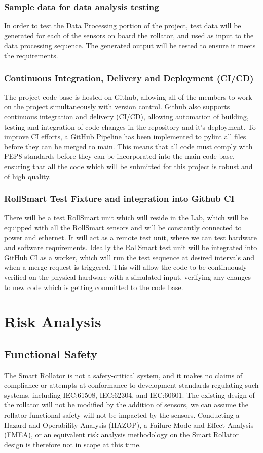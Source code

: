 \documentclass{article}
\begin{document}
\subsubsection{Sample data for data analysis testing}
In order to test the Data Processing portion of the project, test data will be generated for each of the sensors on board the rollator, and used as input to the data processing sequence. The generated output will be tested to ensure it meets the requirements. 

\subsubsection{Continuous Integration, Delivery and Deployment (CI/CD)}
The project code base is hosted on Github, allowing all of the members to work on the project simultaneously with version control. Github also supports continuous integration and delivery (CI/CD), allowing automation of building, testing and integration of code changes in the repository and it's deployment. 
To improve CI efforts, a GitHub Pipeline has been implemented to pylint all files before they can be merged to main. This means that all code must comply with PEP8 standards before they can be incorporated into the main code base, ensuring that all the code which will be submitted for this project is robust and of high quality.

\subsubsection{RollSmart Test Fixture and integration into Github CI}
There will be a test RollSmart unit which will reside in the Lab, which will be equipped with all the RollSmart sensors and will be constantly connected to power and ethernet. It will  act as a remote test unit, where we can test hardware and software requirements. Ideally the RollSmart test unit will be integrated into GitHub CI as a worker, which will run the test sequence at desired intervals and when a merge request is triggered. This will allow the code to be continuously verified on the physical hardware with a simulated input, verifying any changes to new code which is getting committed to the code base. 

\section{Risk Analysis}
\subsection{Functional Safety}
The Smart Rollator is not a safety-critical system, and it makes no claims of compliance or attempts at conformance to development standards regulating such systems, including IEC:61508, IEC:62304, and IEC:60601. The existing design of the rollator will not be modified by the addition of sensors, we can assume the rollator functional safety will not be impacted by the sensors. Conducting a Hazard and Operability Analysis (HAZOP), a Failure Mode and Effect Analysis (FMEA), or an equivalent risk analysis methodology on the Smart Rollator design is therefore not in scope at this time. 
\end{document}
